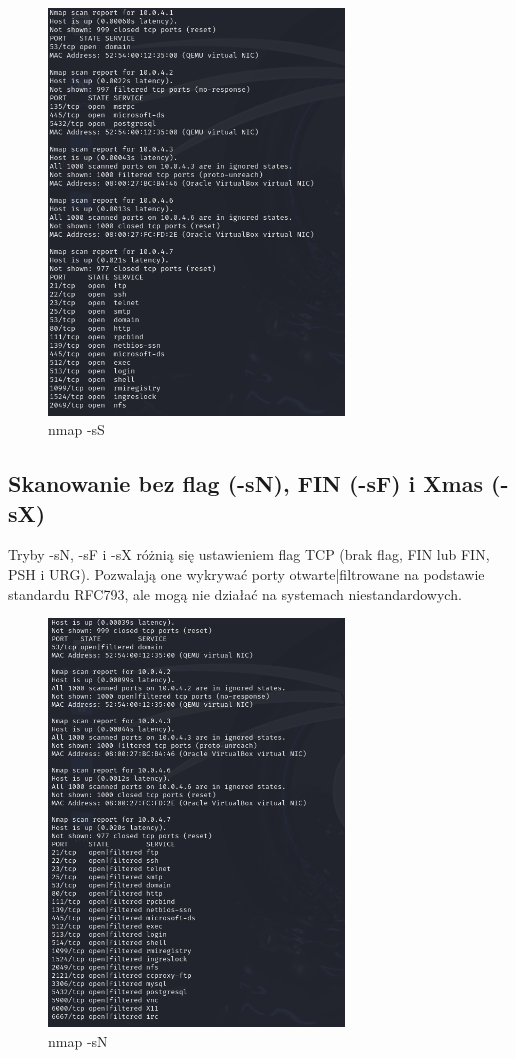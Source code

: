 \documentclass{article}
\begin{document}
\begin{figure}[H]
  \centering
  \includegraphics[width=0.7\textwidth]{nmap_ss.png}
  \caption{nmap -sS}
\end{figure}

\subsection*{Skanowanie bez flag (-sN), FIN (-sF) i Xmas (-sX)}
Tryby -sN, -sF i -sX różnią się ustawieniem flag TCP (brak flag, FIN lub FIN, PSH i URG). Pozwalają one wykrywać porty otwarte|filtrowane na podstawie standardu RFC793, ale mogą nie działać na systemach niestandardowych.

\begin{figure}[H]
  \centering
  \includegraphics[width=0.7\textwidth]{nmap_sN.png}
  \caption{nmap -sN}
\end{figure}
\end{document}
